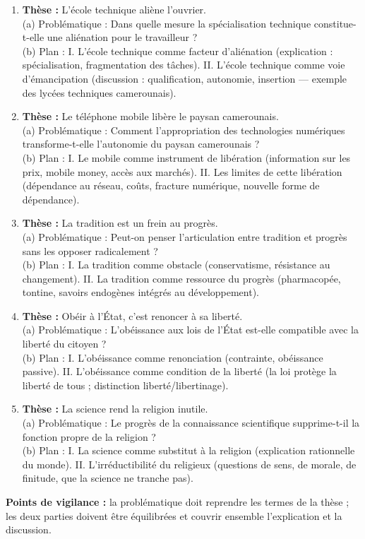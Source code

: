 \documentclass[11pt]{article}
\begin{document}
\begin{exoresolu}
\begin{enumerate}
\item \textbf{Thèse :} \og L'école technique aliène l'ouvrier. \fg\\
(a) Problématique : Dans quelle mesure la spécialisation technique constitue-t-elle une aliénation pour le travailleur ?\\
(b) Plan : I. L'école technique comme facteur d'aliénation (explication : spécialisation, fragmentation des tâches). II. L'école technique comme voie d'émancipation (discussion : qualification, autonomie, insertion — exemple des lycées techniques camerounais).
\item \textbf{Thèse :} \og Le téléphone mobile libère le paysan camerounais. \fg\\
(a) Problématique : Comment l'appropriation des technologies numériques transforme-t-elle l'autonomie du paysan camerounais ?\\
(b) Plan : I. Le mobile comme instrument de libération (information sur les prix, mobile money, accès aux marchés). II. Les limites de cette libération (dépendance au réseau, coûts, fracture numérique, nouvelle forme de dépendance).
\item \textbf{Thèse :} \og La tradition est un frein au progrès. \fg\\
(a) Problématique : Peut-on penser l'articulation entre tradition et progrès sans les opposer radicalement ?\\
(b) Plan : I. La tradition comme obstacle (conservatisme, résistance au changement). II. La tradition comme ressource du progrès (pharmacopée, tontine, savoirs endogènes intégrés au développement).
\item \textbf{Thèse :} \og Obéir à l'État, c'est renoncer à sa liberté. \fg\\
(a) Problématique : L'obéissance aux lois de l'État est-elle compatible avec la liberté du citoyen ?\\
(b) Plan : I. L'obéissance comme renonciation (contrainte, obéissance passive). II. L'obéissance comme condition de la liberté (la loi protège la liberté de tous ; distinction liberté/libertinage).
\item \textbf{Thèse :} \og La science rend la religion inutile. \fg\\
(a) Problématique : Le progrès de la connaissance scientifique supprime-t-il la fonction propre de la religion ?\\
(b) Plan : I. La science comme substitut à la religion (explication rationnelle du monde). II. L'irréductibilité du religieux (questions de sens, de morale, de finitude, que la science ne tranche pas).
\end{enumerate}
\textbf{Points de vigilance :} la problématique doit reprendre les termes de la thèse ; les deux parties doivent être équilibrées et couvrir ensemble l'explication et la discussion.
\end{exoresolu}
\end{document}
